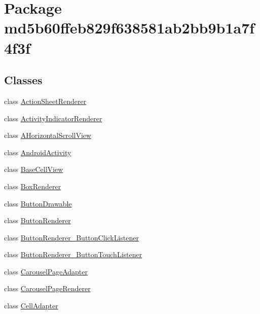 \hypertarget{namespacemd5b60ffeb829f638581ab2bb9b1a7f4f3f}{
\section{Package md5b60ffeb829f638581ab2bb9b1a7f4f3f}
\label{namespacemd5b60ffeb829f638581ab2bb9b1a7f4f3f}
}
\subsection*{Classes}
\begin{CompactItemize}
\item 
class \hyperlink{classmd5b60ffeb829f638581ab2bb9b1a7f4f3f_1_1_action_sheet_renderer}{ActionSheetRenderer}
\item 
class \hyperlink{classmd5b60ffeb829f638581ab2bb9b1a7f4f3f_1_1_activity_indicator_renderer}{ActivityIndicatorRenderer}
\item 
class \hyperlink{classmd5b60ffeb829f638581ab2bb9b1a7f4f3f_1_1_a_horizontal_scroll_view}{AHorizontalScrollView}
\item 
class \hyperlink{classmd5b60ffeb829f638581ab2bb9b1a7f4f3f_1_1_android_activity}{AndroidActivity}
\item 
class \hyperlink{classmd5b60ffeb829f638581ab2bb9b1a7f4f3f_1_1_base_cell_view}{BaseCellView}
\item 
class \hyperlink{classmd5b60ffeb829f638581ab2bb9b1a7f4f3f_1_1_box_renderer}{BoxRenderer}
\item 
class \hyperlink{classmd5b60ffeb829f638581ab2bb9b1a7f4f3f_1_1_button_drawable}{ButtonDrawable}
\item 
class \hyperlink{classmd5b60ffeb829f638581ab2bb9b1a7f4f3f_1_1_button_renderer}{ButtonRenderer}
\item 
class \hyperlink{classmd5b60ffeb829f638581ab2bb9b1a7f4f3f_1_1_button_renderer___button_click_listener}{ButtonRenderer\_\-ButtonClickListener}
\item 
class \hyperlink{classmd5b60ffeb829f638581ab2bb9b1a7f4f3f_1_1_button_renderer___button_touch_listener}{ButtonRenderer\_\-ButtonTouchListener}
\item 
class \hyperlink{classmd5b60ffeb829f638581ab2bb9b1a7f4f3f_1_1_carousel_page_adapter}{CarouselPageAdapter}
\item 
class \hyperlink{classmd5b60ffeb829f638581ab2bb9b1a7f4f3f_1_1_carousel_page_renderer}{CarouselPageRenderer}
\item 
class \hyperlink{classmd5b60ffeb829f638581ab2bb9b1a7f4f3f_1_1_cell_adapter}{CellAdapter}

\end{CompactItemize}
